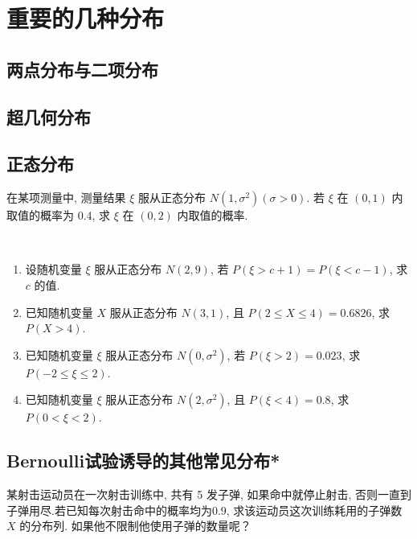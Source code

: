 \section{重要的几种分布}
\subsection{两点分布与二项分布}
\begin{definition}
    
\end{definition}
\clearpage
\subsection{超几何分布}
\begin{definition}
    
\end{definition}
\clearpage
\subsection{正态分布}
\begin{definition}[正态分布]\label{def:正态分布}
    
\end{definition}


\begin{example}
    在某项测量中,
    测量结果 $\xi$ 服从正态分布 $N(1, \sigma^2) (\sigma > 0)$. 若 $\xi$ 在 $(0, 1)$ 内取值的概率为 0.4,
    求 $\xi$ 在 $(0, 2)$ 内取值的概率.
\end{example}

\begin{exercise}
    \,

    \begin{enumerate}
        \item 设随机变量 $\xi$ 服从正态分布 $N(2, 9)$, 若 $P(\xi > c + 1) = P(\xi < c - 1)$, 求 $c$ 的值.
        \item 已知随机变量 $X$ 服从正态分布 $N(3, 1)$, 且 $P(2 \leq X \leq 4) = 0.6826$, 求 $P(X > 4)$.
        \item 已知随机变量 $\xi$ 服从正态分布 $N(0, \sigma^2)$, 若 $P(\xi > 2) = 0.023$, 求 $P(-2 \leq \xi \leq 2)$.
        \item 已知随机变量 $\xi$ 服从正态分布 $N(2, \sigma^2)$, 且 $P(\xi < 4) = 0.8$, 求 $P(0 < \xi < 2)$.
    \end{enumerate}
\end{exercise}





\clearpage
\subsection{Bernoulli试验诱导的其他常见分布*}
\begin{example}
    某射击运动员在一次射击训练中, 共有 5 发子弹, 如果命中就停止射击, 否则一直到子弹用尽.若已知每次射击命中的概率均为$ 0.9$, 求该运动员这次训练耗用的子弹数 $X$ 的分布列.
    如果他不限制他使用子弹的数量呢？
\end{example}
\clearpage

\review

\clearpage
\hw